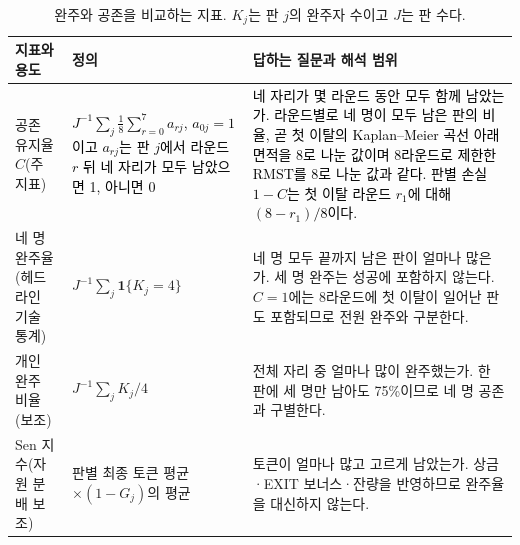 \begin{table}[H]
\color{black}\centering\footnotesize
\setlength{\tabcolsep}{4pt}
\caption{완주와 공존을 비교하는 지표. $K_j$는 판 $j$의 완주자 수이고 $J$는 판 수다.}\label{tab:coexistence-candidates}
\begin{tabularx}{\textwidth}{@{}p{}p{}X@{}}
\toprule
지표와 용도 & 정의 & 답하는 질문과 해석 범위 \\
\midrule
공존 유지율 $C$(주 지표) & \textcolor{black}{$J^{-1}\sum_j \frac{1}{8}\sum_{r=0}^{7} a_{rj}$, $a_{0j}=1$이고 $a_{rj}$는 판 $j$에서 라운드 $r$ 뒤 네 자리가 모두 남았으면 1, 아니면 0} & \textcolor{black}{네 자리가 몇 라운드 동안 모두 함께 남았는가. 라운드별로 네 명이 모두 남은 판의 비율, 곧 첫 이탈의 Kaplan--Meier 곡선 아래 면적을 8로 나눈 값이며 8라운드로 제한한 RMST를 8로 나눈 값과 같다. 판별 손실 $1-C$는 첫 이탈 라운드 $r_1$에 대해 $(8-r_1)/8$이다.} \\
네 명 완주율(헤드라인 기술 통계) & $J^{-1}\sum_j\mathbf{1}\{K_j=4\}$ & 네 명 모두 끝까지 남은 판이 얼마나 많은가. 세 명 완주는 성공에 포함하지 않는다. $C=1$에는 8라운드에 첫 이탈이 일어난 판도 포함되므로 전원 완주와 구분한다. \\
개인 완주 비율(보조) & $J^{-1}\sum_j K_j/4$ & 전체 자리 중 얼마나 많이 완주했는가. 한 판에 세 명만 남아도 75\%이므로 네 명 공존과 구별한다. \\
Sen 지수(자원 분배 보조) & 판별 최종 토큰 평균 $\times(1-G_j)$의 평균 & 토큰이 얼마나 많고 고르게 남았는가. 상금·EXIT 보너스·잔량을 반영하므로 완주율을 대신하지 않는다. \\
\bottomrule
\end{tabularx}
\end{table}
